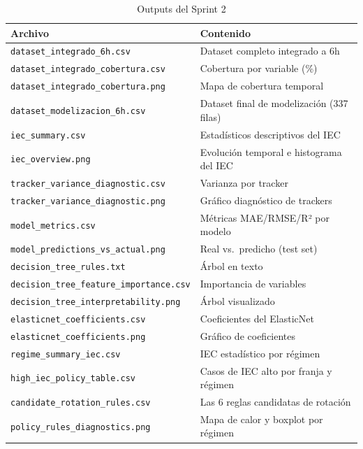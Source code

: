 \documentclass[12pt,a4paper]{article}
\begin{document}
\begin{table}[H]
\centering
\caption{Outputs del Sprint 2}
\begin{tabular}{ll}
\toprule
\textbf{Archivo} & \textbf{Contenido} \\
\midrule
\texttt{dataset\_integrado\_6h.csv}          & Dataset completo integrado a 6h \\
\texttt{dataset\_integrado\_cobertura.csv}   & Cobertura por variable (\%) \\
\texttt{dataset\_integrado\_cobertura.png}   & Mapa de cobertura temporal \\
\texttt{dataset\_modelizacion\_6h.csv}       & Dataset final de modelización (337 filas) \\
\texttt{iec\_summary.csv}                    & Estadísticos descriptivos del IEC \\
\texttt{iec\_overview.png}                   & Evolución temporal e histograma del IEC \\
\texttt{tracker\_variance\_diagnostic.csv}   & Varianza por tracker \\
\texttt{tracker\_variance\_diagnostic.png}   & Gráfico diagnóstico de trackers \\
\texttt{model\_metrics.csv}                  & Métricas MAE/RMSE/R² por modelo \\
\texttt{model\_predictions\_vs\_actual.png}  & Real vs.\ predicho (test set) \\
\texttt{decision\_tree\_rules.txt}           & Árbol en texto \\
\texttt{decision\_tree\_feature\_importance.csv} & Importancia de variables \\
\texttt{decision\_tree\_interpretability.png}    & Árbol visualizado \\
\texttt{elasticnet\_coefficients.csv}        & Coeficientes del ElasticNet \\
\texttt{elasticnet\_coefficients.png}        & Gráfico de coeficientes \\
\texttt{regime\_summary\_iec.csv}            & IEC estadístico por régimen \\
\texttt{high\_iec\_policy\_table.csv}        & Casos de IEC alto por franja y régimen \\
\texttt{candidate\_rotation\_rules.csv}      & Las 6 reglas candidatas de rotación \\
\texttt{policy\_rules\_diagnostics.png}      & Mapa de calor y boxplot por régimen \\
\bottomrule
\end{tabular}
\end{table}
\end{document}
